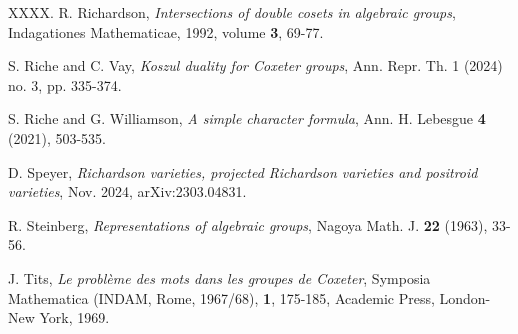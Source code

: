 \documentclass[11pt]{article}
\theoremstyle{remark}
\theoremstyle{definition}
\begin{document}
{\begin{thebibliography}{XXXX.}
R. Richardson,
\emph{Intersections of double cosets in algebraic groups},
Indagationes Mathematicae, 1992, volume \textbf{3}, 69-77.

S. Riche and C. Vay,
\emph{Koszul duality for Coxeter groups}, 
Ann. Repr. Th. 1 (2024) no. 3, pp. 335-374. 

S. Riche and G. Williamson, 
\emph{A simple character formula},
Ann. H. Lebesgue \textbf{4} (2021), 503-535.

D. Speyer,
\emph{Richardson varieties, projected Richardson varieties and positroid varieties},
Nov. 2024, arXiv:2303.04831.

R. Steinberg,
\emph{Representations of algebraic groups},
Nagoya Math. J. \textbf{22} (1963), 33-56.

J. Tits,
\emph{Le probl\`{e}me des mots dans les groupes de Coxeter},
Symposia Mathematica (INDAM, Rome, 1967/68),  \textbf{1}, 175-185, Academic Press, London-New York, 1969.

\end{thebibliography}
}

\Addresses
\end{document}

